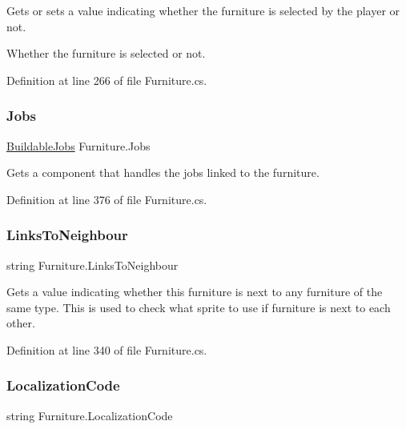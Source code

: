 Gets or sets a value indicating whether the furniture is selected by the player or not. 

Whether the furniture is selected or not.

Definition at line 266 of file Furniture.\+cs.

\mbox{\label{class_furniture_acde3e7f9d40af5b75c441d53778a3fe2}} 
\subsubsection{\texorpdfstring{Jobs}{Jobs}}
{\footnotesize\ttfamily \hyperlink{class_buildable_jobs}{Buildable\+Jobs} Furniture.\+Jobs\hspace{0.3cm}{\ttfamily [get]}}



Gets a component that handles the jobs linked to the furniture. 



Definition at line 376 of file Furniture.\+cs.

\mbox{\label{class_furniture_a5a41f977566d47fb634921bc799fc40a}} 
\subsubsection{\texorpdfstring{Links\+To\+Neighbour}{LinksToNeighbour}}
{\footnotesize\ttfamily string Furniture.\+Links\+To\+Neighbour\hspace{0.3cm}{\ttfamily [get]}}



Gets a value indicating whether this furniture is next to any furniture of the same type. This is used to check what sprite to use if furniture is next to each other. 



Definition at line 340 of file Furniture.\+cs.

\mbox{\label{class_furniture_a9994c5ec8b832590778692fdff7731ee}} 
\subsubsection{\texorpdfstring{Localization\+Code}{LocalizationCode}}
{\footnotesize\ttfamily string Furniture.\+Localization\+Code\hspace{0.3cm}{\ttfamily [get]}}



